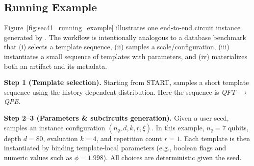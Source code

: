 



 







\subsection{Running Example}
\label{sec:worked_example_qft_qpe}

Figure~\ref{fig:sec41_running_example} illustrates one end-to-end circuit instance generated by \sys.
The workflow is intentionally analogous to a database benchmark that (i)  selects a template sequence, (ii) samples a scale/configuration,
(iii) instantiates a small sequence of templates with parameters, and  (iv) materializes both an artifact and its metadata.

\textbf{Step 1 (Template selection).} Starting from START, \sys samples a short
template sequence using the history-dependent distribution. Here the sequence is
\emph{QFT} $\rightarrow$ \emph{QPE}.

\textbf{Step 2--3 (Parameters \& subcircuits generation).}  Given a user seed, \sys samples an instance configuration
$(n_q, d, k, r, \xi)$. In this example, $n_q{=}7$ qubits, depth  $d{=}80$, evaluation  $k{=}4$,
and repetition count $r{=}1$. Each template is then instantiated by binding
template-local parameters (e.g., boolean flags and numeric values such as $\phi{=}1.998$). All choices are deterministic given the seed.

